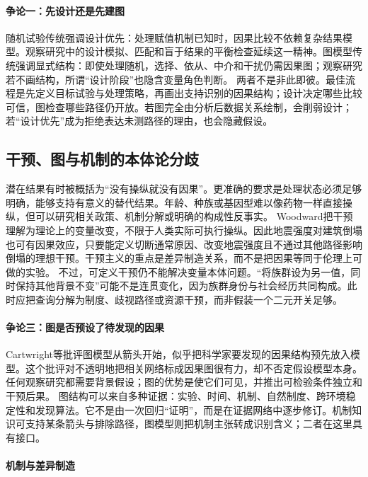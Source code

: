 \paragraph{争论一：先设计还是先建图}

随机试验传统强调设计优先：处理赋值机制已知时，因果比较不依赖复杂结果模型。观察研究中的设计模拟、匹配和盲于结果的平衡检查延续这一精神。图模型传统强调显式结构：即使处理随机，选择、依从、中介和干扰仍需因果图；观察研究若不画结构，所谓“设计阶段”也隐含变量角色判断。
两者不是非此即彼。最佳流程是先定义目标试验与处理策略，再画出支持识别的因果结构；设计决定哪些比较可信，图检查哪些路径仍开放。若图完全由分析后数据关系绘制，会削弱设计；若“设计优先”成为拒绝表达未测路径的理由，也会隐藏假设。

\subsection{干预、图与机制的本体论分歧}

潜在结果有时被概括为“没有操纵就没有因果”。更准确的要求是处理状态必须足够明确，能够支持有意义的替代结果。年龄、种族或基因型难以像药物一样直接操纵，但可以研究相关政策、机制分解或明确的构成性反事实。
Woodward把干预理解为理论上的变量改变，不限于人类实际可执行操纵。因此地震强度对建筑倒塌也可有因果效应，只要能定义切断通常原因、改变地震强度且不通过其他路径影响倒塌的理想干预。干预主义的重点是差异制造关系，而不是把因果等同于伦理上可做的实验。
不过，可定义干预仍不能解决变量本体问题。“将族群设为另一值，同时保持其他背景不变”可能不是连贯变化，因为族群身份与社会经历共同构成。此时应把查询分解为制度、歧视路径或资源干预，而非假装一个二元开关足够。

\paragraph{争论三：图是否预设了待发现的因果}

Cartwright等批评图模型从箭头开始，似乎把科学家要发现的因果结构预先放入模型。这个批评对不透明地把相关网络标成因果图很有力，却不否定假设模型本身。任何观察研究都需要背景假设；图的优势是使它们可见，并推出可检验条件独立和干预后果。
图结构可以来自多种证据：实验、时间、机制、自然制度、跨环境稳定性和发现算法。它不是由一次回归“证明”，而是在证据网络中逐步修订。机制知识可支持某条箭头与排除路径，图模型则把机制主张转成识别含义；二者在这里具有接口。

\paragraph{机制与差异制造}

